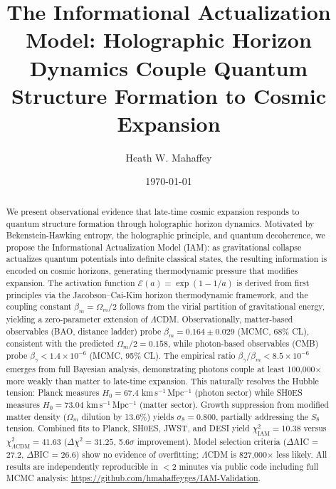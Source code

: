 \documentclass[twocolumn,superscriptaddress,prl,amsmath,amssymb]{revtex4-2}
\begin{document}
\title{The Informational Actualization Model: Holographic Horizon Dynamics Couple Quantum Structure Formation to Cosmic Expansion}

\author{Heath W. Mahaffey}

\date{\today}

\begin{abstract}
We present observational evidence that late-time cosmic expansion responds to quantum structure formation through holographic horizon dynamics. Motivated by Bekenstein-Hawking entropy, the holographic principle, and quantum decoherence, we propose the Informational Actualization Model (IAM): as gravitational collapse actualizes quantum potentials into definite classical states, the resulting information is encoded on cosmic horizons, generating thermodynamic pressure that modifies expansion. The activation function $\mathcal{E}(a) = \exp(1-1/a)$ is derived from first principles via the Jacobson--Cai-Kim horizon thermodynamic framework, and the coupling constant $\beta_m = \Omega_m/2$ follows from the virial partition of gravitational energy, yielding a zero-parameter extension of $\Lambda$CDM. Observationally, matter-based observables (BAO, distance ladder) probe $\beta_m = 0.164 \pm 0.029$ (MCMC, 68\% CL), consistent with the predicted $\Omega_m/2 = 0.158$, while photon-based observables (CMB) probe $\beta_\gamma < 1.4 \times 10^{-6}$ (MCMC, 95\% CL). The empirical ratio $\beta_\gamma/\beta_m < 8.5 \times 10^{-6}$ emerges from full Bayesian analysis, demonstrating photons couple at least 100,000$\times$ more weakly than matter to late-time expansion. This naturally resolves the Hubble tension: Planck measures $H_0 = 67.4$ km\,s$^{-1}$\,Mpc$^{-1}$ (photon sector) while SH0ES measures $H_0 = 73.04$ km\,s$^{-1}$\,Mpc$^{-1}$ (matter sector). Growth suppression from modified matter density ($\Omega_m$ dilution by 13.6\%) yields $\sigma_8 = 0.800$, partially addressing the $S_8$ tension. Combined fits to Planck, SH0ES, JWST, and DESI yield $\chi^2_{\text{IAM}} = 10.38$ versus $\chi^2_{\Lambda\text{CDM}} = 41.63$ ($\Delta\chi^2 = 31.25$, 5.6$\sigma$ improvement). Model selection criteria ($\Delta$AIC = 27.2, $\Delta$BIC = 26.6) show no evidence of overfitting; $\Lambda$CDM is 827,000$\times$ less likely. All results are independently reproducible in $<$2 minutes via public code including full MCMC analysis: \url{https://github.com/hmahaffeyges/IAM-Validation}.
\end{abstract}
\end{document}

